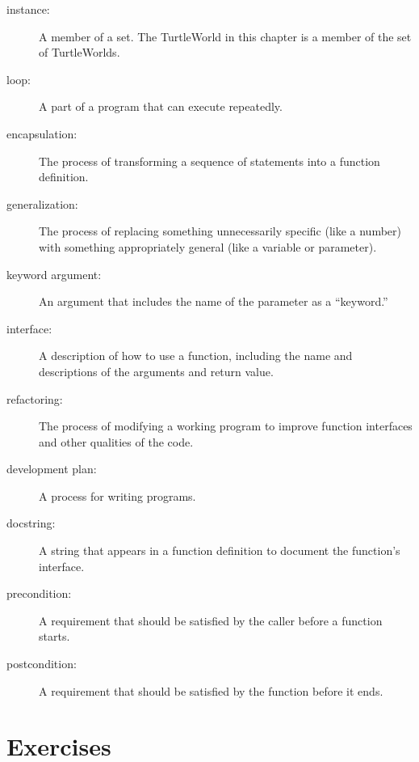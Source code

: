 \documentclass[10pt]{book}
\begin{document}
\begin{CJK}{UTF8}{gbsn}
\begin{description}

\item[instance:] A member of a set.  The TurtleWorld in this
chapter is a member of the set of TurtleWorlds.

\item[loop:] A part of a program that can execute repeatedly.

\item[encapsulation:] The process of transforming a sequence of
statements into a function definition.

\item[generalization:] The process of replacing something
unnecessarily specific (like a number) with something appropriately
general (like a variable or parameter).

\item[keyword argument:] An argument that includes the name of
the parameter as a ``keyword.''

\item[interface:] A description of how to use a function, including
the name and descriptions of the arguments and return value.

\item[refactoring:] The process of modifying a working program to
  improve function interfaces and other qualities of the code.

\item[development plan:] A process for writing programs.

\item[docstring:]  A string that appears in a function definition
to document the function's interface.

\item[precondition:] A requirement that should be satisfied by
the caller before a function starts.

\item[postcondition:] A requirement that should be satisfied by
the function before it ends.

\end{description}


\section{Exercises}


\end{CJK}
\end{document}

